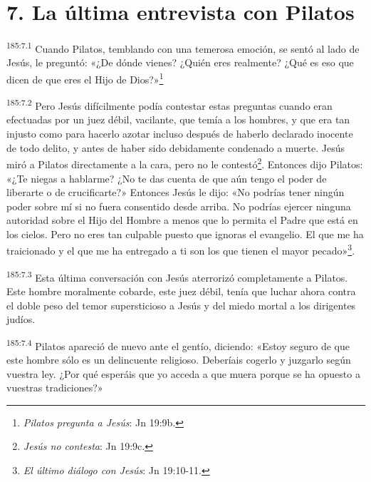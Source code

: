 \section*{7. La última entrevista con Pilatos}
\par 
\textsuperscript{185:7.1} Cuando Pilatos, temblando con una temerosa emoción, se sentó al lado de Jesús, le preguntó: «¿De dónde vienes? ¿Quién eres realmente? ¿Qué es eso que dicen de que eres el Hijo de Dios?»\footnote{\textit{Pilatos pregunta a Jesús}: Jn 19:9b.}

\par 
\textsuperscript{185:7.2} Pero Jesús difícilmente podía contestar estas preguntas cuando eran efectuadas por un juez débil, vacilante, que temía a los hombres, y que era tan injusto como para hacerlo azotar incluso después de haberlo declarado inocente de todo delito, y antes de haber sido debidamente condenado a muerte. Jesús miró a Pilatos directamente a la cara, pero no le contestó\footnote{\textit{Jesús no contesta}: Jn 19:9c.}. Entonces dijo Pilatos: «¿Te niegas a hablarme? ¿No te das cuenta de que aún tengo el poder de liberarte o de crucificarte?» Entonces Jesús le dijo: «No podrías tener ningún poder sobre mí si no fuera consentido desde arriba. No podrías ejercer ninguna autoridad sobre el Hijo del Hombre a menos que lo permita el Padre que está en los cielos. Pero no eres tan culpable puesto que ignoras el evangelio. El que me ha traicionado y el que me ha entregado a ti son los que tienen el mayor pecado»\footnote{\textit{El último diálogo con Jesús}: Jn 19:10-11.}.

\par 
\textsuperscript{185:7.3} Esta última conversación con Jesús aterrorizó completamente a Pilatos. Este hombre moralmente cobarde, este juez débil, tenía que luchar ahora contra el doble peso del temor supersticioso a Jesús y del miedo mortal a los dirigentes judíos.

\par 
\textsuperscript{185:7.4} Pilatos apareció de nuevo ante el gentío, diciendo: «Estoy seguro de que este hombre sólo es un delincuente religioso. Deberíais cogerlo y juzgarlo según vuestra ley. ¿Por qué esperáis que yo acceda a que muera porque se ha opuesto a vuestras tradiciones?»

